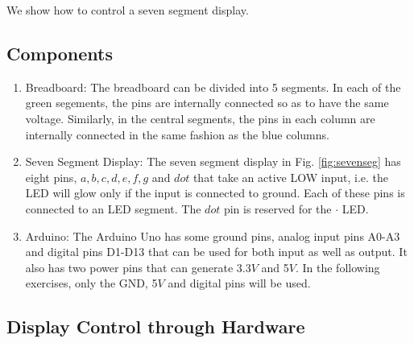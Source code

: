 We show how to control
a seven segment display.
\subsection{Components}
\begin{enumerate}[label=\arabic*.,ref=\theenumi]
\begin{table}[!ht]

\caption{Components}
\label{table:components}
\end{table}
\item Breadboard:
The breadboard can be divided into 5 segments.  In each of the green segements, the pins are internally connected so as to have the same voltage.  Similarly, in the central segments, the pins in each column  are internally connected in the same fashion as the blue columns. 
\item Seven Segment Display:
The seven segment display in Fig. \ref{fig:sevenseg} has eight pins, $a, b, c, d, e, f, g$ and $dot$ that take an active LOW input, i.e.  the LED will glow only if the input is connected to ground.  Each of these pins is connected to an LED segment.  The $dot$ pin is  reserved for the $\cdot$ LED.  

\item Arduino:
The Arduino Uno has some ground pins, analog input pins A0-A3 and digital pins D1-D13 that can be used for both input as well as output. It also has two power pins that can generate 3.3$V$ and 5$V$.  In the following exercises, only the GND, 5$V$ and digital pins will be used.

\end{enumerate}

\subsection{Display Control through Hardware }

